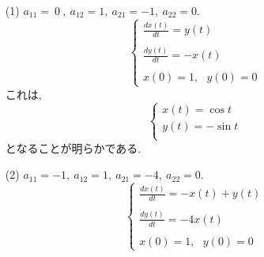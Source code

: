 \documentclass[11pt]{jsarticle}
\begin{document}
\begin{itemize}
\item[(1)] $a_{11} = \ 0\ , \ a_{12} = 1, \ a_{21} = -1, \ a_{22} = 0$.
\[\left\{ 
\begin{array}{l}
\displaystyle \frac{dx(t)}{dt} = y(t) \\ \\
\displaystyle \frac{dy(t)}{dt} = -x(t) \\ \\
x(0) = 1,\ \ \  y(0) = 0
\end{array}
\right.\]
これは, 
\[\left\{ 
\begin{array}{l}
\displaystyle x(t) = \cos t \\
\displaystyle y(t) = -\sin t \\
\end{array}
\right. \]
となることが明らかである. 

\item[(2)] $a_{11} = -1, \ a_{12} = 1, \ a_{21} = -4, \ a_{22} = 0$.
\[\left\{ 
\begin{array}{l}
\displaystyle \frac{dx(t)}{dt} = -x(t) + y(t) \\ \\
\displaystyle \frac{dy(t)}{dt} = -4x(t) \\ \\
x(0) = 1,\ \ \  y(0) = 0
\end{array}
\right.\]


\end{itemize}
\end{document}
